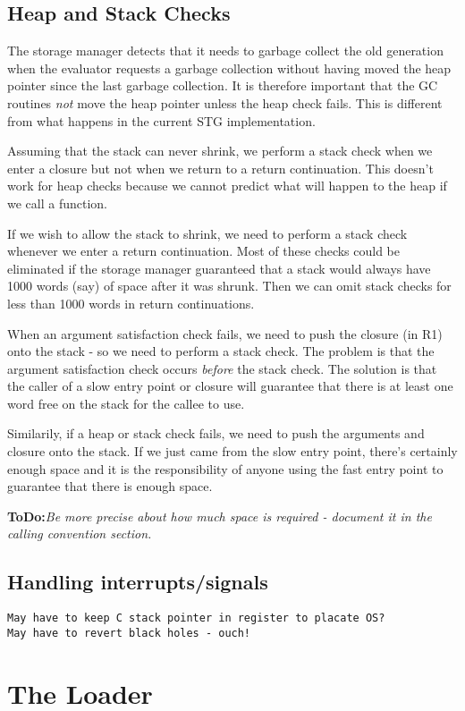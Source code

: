\documentclass[11pt]{article}
\newcommand{\ToDo}[1]{{{\bf ToDo:}\sl #1}}
\newcommand{\Subsection}[2]{\subsection{#1}\label{sec:#2}}
\begin{document}
\Subsection{Heap and Stack Checks}{heap-and-stack-checks}

The storage manager detects that it needs to garbage collect the old
generation when the evaluator requests a garbage collection without
having moved the heap pointer since the last garbage collection.  It
is therefore important that the GC routines \emph{not} move the heap
pointer unless the heap check fails.  This is different from what
happens in the current STG implementation.

Assuming that the stack can never shrink, we perform a stack check
when we enter a closure but not when we return to a return
continuation.  This doesn't work for heap checks because we cannot
predict what will happen to the heap if we call a function.

If we wish to allow the stack to shrink, we need to perform a stack
check whenever we enter a return continuation.  Most of these checks
could be eliminated if the storage manager guaranteed that a stack
would always have 1000 words (say) of space after it was shrunk.  Then
we can omit stack checks for less than 1000 words in return
continuations.

When an argument satisfaction check fails, we need to push the closure
(in R1) onto the stack - so we need to perform a stack check.  The
problem is that the argument satisfaction check occurs \emph{before}
the stack check.  The solution is that the caller of a slow entry
point or closure will guarantee that there is at least one word free
on the stack for the callee to use.  

Similarily, if a heap or stack check fails, we need to push the arguments
and closure onto the stack.  If we just came from the slow entry point, 
there's certainly enough space and it is the responsibility of anyone
using the fast entry point to guarantee that there is enough space.

\ToDo{Be more precise about how much space is required - document it
in the calling convention section.}

\Subsection{Handling interrupts/signals}{signals}

\begin{verbatim}
May have to keep C stack pointer in register to placate OS?
May have to revert black holes - ouch!
\end{verbatim}



\section{The Loader}
\end{document}
